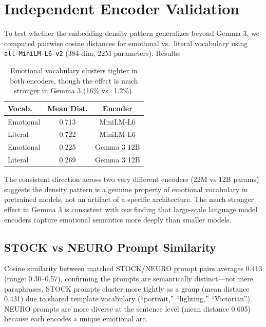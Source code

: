 \documentclass[10pt,twocolumn,letterpaper]{article}
\begin{document}

\section{Independent Encoder Validation}

To test whether the embedding density pattern generalizes beyond Gemma 3, we computed pairwise cosine distances for emotional vs.\ literal vocabulary using \texttt{all-MiniLM-L6-v2} (384-dim, 22M parameters). Results:

\begin{table}[h]
\centering
\small
\begin{tabular}{lcc}
\toprule
\textbf{Vocab.} & \textbf{Mean Dist.} & \textbf{Encoder} \\
\midrule
Emotional & 0.713 & MiniLM-L6 \\
Literal & 0.722 & MiniLM-L6 \\
\midrule
Emotional & 0.225 & Gemma 3 12B \\
Literal & 0.269 & Gemma 3 12B \\
\bottomrule
\end{tabular}
\caption{Emotional vocabulary clusters tighter in both encoders, though the effect is much stronger in Gemma 3 (16\% vs.\ 1.2\%).}
\end{table}

The consistent direction across two very different encoders (22M vs 12B params) suggests the density pattern is a genuine property of emotional vocabulary in pretrained models, not an artifact of a specific architecture. The much stronger effect in Gemma 3 is consistent with our finding that large-scale language model encoders capture emotional semantics more deeply than smaller models.

\subsection{STOCK vs NEURO Prompt Similarity}

Cosine similarity between matched STOCK/NEURO prompt pairs averages 0.413 (range: 0.30--0.57), confirming the prompts are semantically distinct---not mere paraphrases. STOCK prompts cluster more tightly as a group (mean distance 0.431) due to shared template vocabulary (``portrait,'' ``lighting,'' ``Victorian''). NEURO prompts are more diverse at the sentence level (mean distance 0.605) because each encodes a unique emotional arc.
\end{document}
